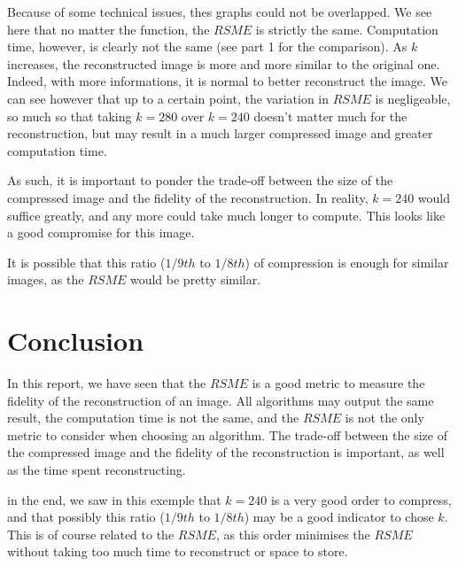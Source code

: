 \documentclass{article}
\begin{document}
Because of some technical issues, thes graphs could not be overlapped. We see here that no matter the function, the $RSME$ is strictly the same. Computation time, however, is clearly not the same (see part 1 for the comparison).
As $k$ increases, the reconstructed image is more and more similar to the original one. Indeed, with more informations, it is normal to better reconstruct the image.
We can see however that up to a certain point, the variation in $RSME$ is negligeable, so much so that taking $k=280$ over $k=240$ doesn't matter much for the reconstruction, but may result in a much larger compressed image and greater computation time.

As such, it is important to ponder the trade-off between the size of the compressed image and the fidelity of the reconstruction. In reality, $k=240$ would suffice greatly, and any more could take much longer to compute. This looks like a good compromise for this image.

It is possible that this ratio ($1/9th$ to $1/8th$) of compression is enough for similar images, as the $RSME$ would be pretty similar.

\section*{Conclusion}

    In this report, we have seen that the $RSME$ is a good metric to measure the fidelity of the reconstruction of an image. All algorithms may output the same result, the computation time is not the same, and the $RSME$ is not the only metric to consider when choosing an algorithm. The trade-off between the size of the compressed image and the fidelity of the reconstruction is important, as well as the time spent reconstructing.

    in the end, we saw in this exemple that $k=240$ is a very good order to compress, and that possibly this ratio ($1/9th$ to $1/8th$) may be a good indicator to chose $k$. This is of course related to the $RSME$, as this order minimises the $RSME$ without taking too much time to reconstruct or space to store.
\end{document}

